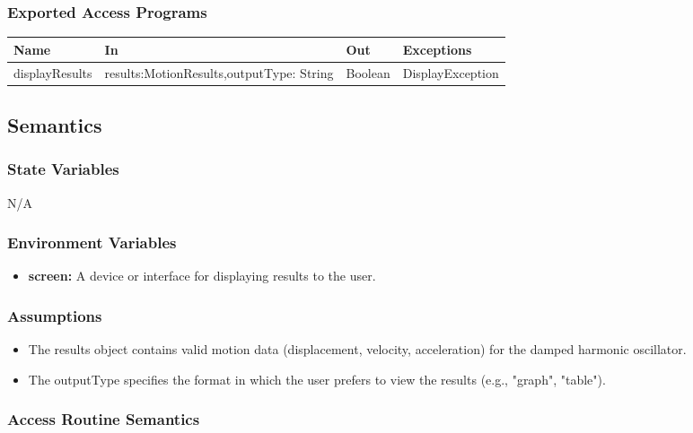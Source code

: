 \documentclass[12pt, titlepage]{article}
\begin{document}
\subsubsection{Exported Access Programs}

\begin{center}
\begin{tabular}{p{4cm} p{4cm} p{3cm} p{5cm}}
\hline
\textbf{Name} & \textbf{In} & \textbf{Out} & \textbf{Exceptions} \\
\hline
displayResults & results:MotionResults,outputType: String & Boolean & DisplayException \\
\hline
\end{tabular}
\end{center}

\subsection{Semantics}

\subsubsection{State Variables}
N/A

\subsubsection{Environment Variables}
\begin{itemize}
  \item \textbf{screen:} A device or interface for displaying results to the user.
\end{itemize}

\subsubsection{Assumptions}

\begin{itemize}
  \item The results object contains valid motion data (displacement, velocity, acceleration) for the damped harmonic oscillator.
  \item The outputType specifies the format in which the user prefers to view the results (e.g., "graph", "table").
\end{itemize}

\subsubsection{Access Routine Semantics}
\end{document}
